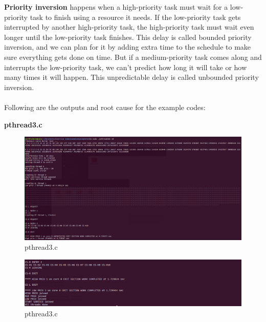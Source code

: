 \documentclass[a4paper,11pt]{article}%
\newenvironment{qanda}{\setlength{\parindent}{0pt}}{\bigskip}
\begin{document}
\begin{qanda}
\begin{enumerate}
\begin{enumerate}
\begin{enumerate}
					            \textbf{Priority inversion} happens when a high-priority task must wait for a low-priority task to finish using a resource it needs. If the low-priority task gets interrupted by another high-priority task, the high-priority task must wait even longer until the low-priority task finishes. This delay is called bounded priority inversion, and we can plan for it by adding extra time to the schedule to make sure everything gets done on time. But if a medium-priority task comes along and interrupts the low-priority task, we can't predict how long it will take or how many times it will happen. This unpredictable delay is called unbounded priority inversion.\\\\
					            Following are the outputs and root cause for the example codes:




					            \textbf{pthread3.c}
								\begin{figure}[H]
									\centering
									\includegraphics[scale=0.37]{figures/pthread3ok.png}
									\caption{pthread3.c}
								\end{figure}

								\begin{figure}[H]
									\centering
									\includegraphics[scale=0.45]{figures/i.png}
									\caption{pthread3.c}
								\end{figure}


\end{enumerate}
\end{enumerate}
\end{enumerate}
\end{qanda}
\end{document}
